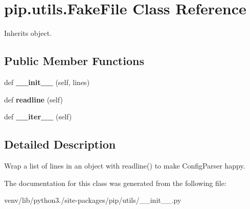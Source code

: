 \hypertarget{classpip_1_1utils_1_1_fake_file}{}\section{pip.\+utils.\+Fake\+File Class Reference}
\label{classpip_1_1utils_1_1_fake_file}


Inherits object.

\subsection*{Public Member Functions}
\begin{DoxyCompactItemize}
\item 
\mbox{\label{classpip_1_1utils_1_1_fake_file_a0c0c221e0f981148a64c5d9ea4693dc4}} 
def {\bfseries \+\_\+\+\_\+init\+\_\+\+\_\+} (self, lines)
\item 
\mbox{\label{classpip_1_1utils_1_1_fake_file_a4c3caeb6e6c90b4f74024ea93312e067}} 
def {\bfseries readline} (self)
\item 
\mbox{\label{classpip_1_1utils_1_1_fake_file_a0e1eeb14205f53cd0af0de92269ce2f3}} 
def {\bfseries \+\_\+\+\_\+iter\+\_\+\+\_\+} (self)
\end{DoxyCompactItemize}


\subsection{Detailed Description}
\begin{DoxyVerb}Wrap a list of lines in an object with readline() to make
ConfigParser happy.\end{DoxyVerb}
 

The documentation for this class was generated from the following file\+:\begin{DoxyCompactItemize}
\item 
venv/lib/python3./site-\/packages/pip/utils/\+\_\+\+\_\+init\+\_\+\+\_\+.\+py\end{DoxyCompactItemize}
